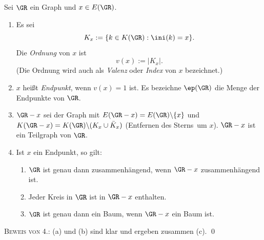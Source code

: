 \DB Sei $\GR$ ein Graph und $x\in E(\GR)$.
\begin{enumerate}
\item Es sei
\[
K_x := \{ k\in K(\GR) : \ini(k)=x \}.
\]
Die \emph{Ordnung} von $x$ ist
\[
v(x) := |K_x|.
\]
(Die Ordnung wird auch als \emph{Valenz}
oder \emph{Index}  von
$x$ bezeichnet.)
\item $x$ heißt \emph{Endpunkt}, wenn $v(x)=1$ ist.
Es bezeichne $\ep(\GR)$\index{$\ep(\GR)$} die Menge der Endpunkte von $\GR$.
\item $\GR-x$ sei der Graph mit $E(\GR-x)=E(\GR)\backslash\{x\}$
und $K(\GR-x)=K(\GR)\backslash(K_x\cup \bar{K}_x)$
(Entfernen des \glqq Sterns\grqq\ um $x$). $\GR-x$ ist ein Teilgraph
von $\GR$.
\item Ist $x$ ein Endpunkt, so gilt:
\begin{enumerate}
	\item $\GR$ ist genau dann zusammenhängend, wenn $\GR-x$
	zusammenhängend ist.
	\item Jeder Kreis in $\GR$ ist in $\GR-x$ enthalten.
	\item $\GR$ ist genau dann ein Baum, wenn $\GR-x$ ein Baum ist.
\end{enumerate}
\end{enumerate}
\textsc{Beweis von 4.:} (a) und (b) sind klar und ergeben
zusammen (c).
\qed


